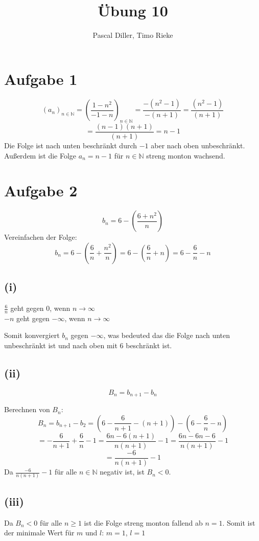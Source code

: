 \documentclass{article}
\title{Übung 10}
\author{Pascal Diller, Timo Rieke}
\begin{document}
\setcounter{secnumdepth}{0}
\maketitle

\section{Aufgabe 1}
\[(a_n)_{n\in \mathbb{N}}=(\frac{1-n^2}{-1-n})_{n \in \mathbb{N}} = \frac{-(n^2-1)}{-(n+1)}= \frac{(n^2-1)}{(n+1)}\]
\[= \frac{(n-1)(n+1)}{(n+1)} = n-1\]
Die Folge ist nach unten beschränkt durch $-1$ aber nach oben unbeschränkt.
Außerdem ist die Folge $a_n = n-1$ für $n \in \mathbb{N}$ streng monton wachsend.

\section{Aufgabe 2}
\[b_n = 6-(\frac{6+n^2}{n})\]
Vereinfachen der Folge:
\[b_n = 6-(\frac{6}{n}+\frac{n^2}{n}) = 6- (\frac{6}{n}+n) = 6-\frac{6}{n}-n\]

\subsection{(i)}
\begin{center}
    $\frac{6}{n}$ geht gegen 0, wenn $n \xrightarrow{} \infty$ \\
    $-n$ geht gegen $-\infty$, wenn $n \xrightarrow{} \infty$ 
\end{center}
Somit konvergiert $b_n$ gegen $-\infty$, was bedeuted das die Folge nach unten unbeschränkt ist und nach oben mit 6 beschränkt ist.

\subsection{(ii)}
\[B_n= b_{n+1}-b_n\]

Berechnen von $B_n$:
\[B_n = b_{n+1}-b_2 = (6-\frac{6}{n+1}-(n+1))-(6-\frac{6}{n}-n)\]
\[= -\frac{6}{n+1}+\frac{6}{n}-1 = \frac{6n-6(n+1)}{n(n+1)}-1= \frac{6n-6n-6}{n(n+1)}-1\]
\[=\frac{-6}{n(n+1)}-1\]
Da $\frac{-6}{n(n+1)}-1$ für alle $n \in \mathbb{N}$ negativ ist, ist $B_n<0$.

\subsection{(iii)}
Da $B_n <0$ für alle $n \geq 1$ ist die Folge streng monton fallend ab $n=1$.
Somit ist der minimale Wert für $m$ und $l$: $m=1$, $l=1$
\end{document}

